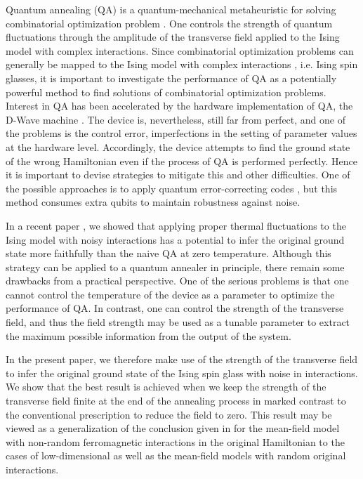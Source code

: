 \documentclass[aps,pra,twocolumn,groupedaddress,longbibliography]{revtex4}
\begin{document}
Quantum annealing (QA) is a quantum-mechanical metaheuristic for solving combinatorial optimization problem \cite{QA,Brooke1999,Farhi2001,Santoro2002,Santoro2006,Das2008,Morita2008,Tanaka_book2017}. One controls the strength of quantum fluctuations through the amplitude of the transverse field applied to the Ising model with complex interactions.  Since combinatorial optimization problems can generally be mapped to the Ising model with complex interactions \cite{lucas2014}, i.e. Ising spin glasses, it is important to investigate the performance of QA as a potentially powerful method to find solutions of combinatorial optimization problems. Interest in QA has been accelerated by the hardware implementation of QA, the D-Wave machine \cite{Johnson2011}. The device is, nevertheless, still far from perfect, and one of the problems is the control error, imperfections in the setting of parameter values at the hardware level. Accordingly, the device attempts to find the ground state of the wrong Hamiltonian even if the process of QA is performed perfectly. Hence it is important to devise strategies to mitigate this and other difficulties. One of the possible approaches is to apply quantum error-correcting codes \cite{jordan2006error,PhysRevLett.100.160506,PhysRevA.86.042333,Young:13,Sarovar:2013kx,Ganti:13,Young:2013fk,Bookatz:2014uq,Marvian:2014nr,Jiang:2015kx,Marvian:2016kb,Marvian-Lidar:16,PAL:13,PAL:14,Vinci:2015jt,Mishra:2015,vinci2015nested,Matsuura2016,Matsuura2017}, but this method consumes extra qubits to maintain robustness against noise.

In a recent paper \cite{Nishimura2016}, we showed that applying proper thermal fluctuations to the Ising model with noisy interactions has a potential to infer the original ground state more faithfully than the naive QA at zero temperature. Although this strategy can be applied to a quantum annealer in principle, there remain some drawbacks from a practical perspective. One of the serious problems is that one cannot control the temperature of the device as a parameter to optimize the performance of QA. In contrast, one can control the strength of the transverse field, and thus the field strength may be used as a tunable parameter to extract the maximum possible information from the output of the system.

In the present paper, we  therefore make use of the strength of the transverse field to infer the original ground state of the Ising spin glass with noise in interactions. We show that the best result is achieved when we keep the strength of the transverse field finite at the end of the annealing process in marked contrast to the conventional prescription to reduce the field to zero.  This result may be viewed as a generalization of the conclusion given in \cite{Otsubo2012} for the mean-field model with non-random ferromagnetic interactions in the original Hamiltonian to the cases of low-dimensional as well as the mean-field models with random original interactions.
\end{document}

